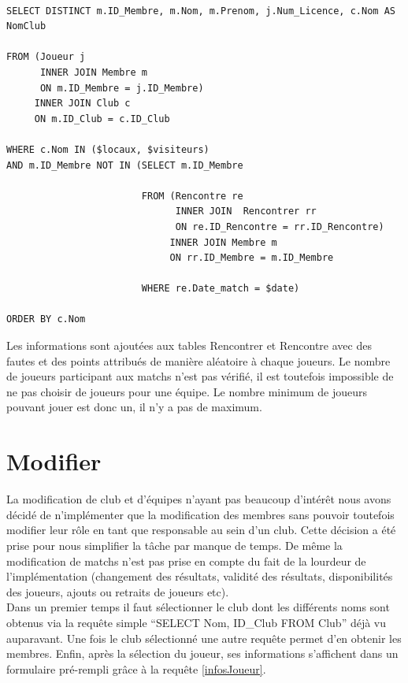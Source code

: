 \documentclass[a4paper»,8pt,french,fleqn]{report}
\begin{document}
\begin{lstlisting}

SELECT DISTINCT m.ID_Membre, m.Nom, m.Prenom, j.Num_Licence, c.Nom AS NomClub 

FROM (Joueur j 
      INNER JOIN Membre m
      ON m.ID_Membre = j.ID_Membre)
     INNER JOIN Club c
     ON m.ID_Club = c.ID_Club

WHERE c.Nom IN ($locaux, $visiteurs)
AND m.ID_Membre NOT IN (SELECT m.ID_Membre

                        FROM (Rencontre re
                              INNER JOIN  Rencontrer rr
                              ON re.ID_Rencontre = rr.ID_Rencontre)
                             INNER JOIN Membre m
                             ON rr.ID_Membre = m.ID_Membre

                        WHERE re.Date_match = $date)

ORDER BY c.Nom

\end{lstlisting}  

Les informations sont ajoutées aux tables Rencontrer et Rencontre avec des fautes et des points attribués de manière aléatoire à chaque joueurs. Le nombre de joueurs participant aux matchs n'est pas vérifié, il est toutefois impossible de ne pas choisir de joueurs pour une équipe. Le nombre minimum de joueurs pouvant jouer est donc un, il n'y a pas de maximum.

\section{Modifier}

La modification de club et d'équipes n'ayant pas beaucoup d'intérêt nous avons décidé de n'implémenter que la modification des membres sans pouvoir toutefois modifier leur rôle en tant que responsable au sein d'un club. Cette décision a été prise pour nous simplifier la tâche par manque de temps. De même la modification de matchs n'est pas prise en compte du fait de la lourdeur de l'implémentation (changement des résultats, validité des résultats, disponibilités des joueurs, ajouts ou retraits de joueurs etc). \\

Dans un premier temps il faut sélectionner le club dont les différents noms sont obtenus via la requête simple ``SELECT Nom, ID\_Club FROM Club'' déjà vu auparavant. Une fois le club sélectionné une autre requête permet d'en obtenir les membres. Enfin, après la sélection du joueur, ses informations s'affichent dans un formulaire pré-rempli grâce à la requête \ref{infosJoueur}.
\end{document}
